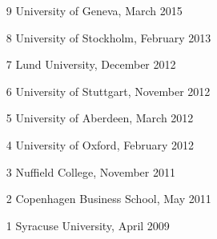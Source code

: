 \begin{enumerate}[topsep=0pt, noitemsep, leftmargin=3\labelsep]
	\item[9] University of Geneva, March 2015
	\item[8] University of Stockholm, February 2013
	\item[7] Lund University, December 2012
	\item[6] University of Stuttgart, November 2012
	\item[5] University of Aberdeen, March 2012
	\item[4] University of Oxford, February 2012
	\item[3] Nuffield College, November 2011
	\item[2] Copenhagen Business School, May 2011
	\item[1] Syracuse University, April 2009
\end{enumerate}

